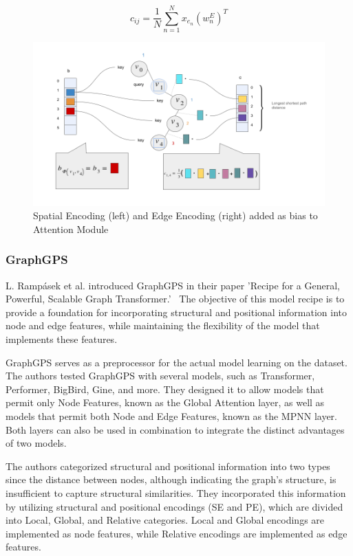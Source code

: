 \begin{equation}
    c_{ij} = \frac{1}{N} \sum_{n=1}^{N} x_{e_n}(w_n^E)^T
\end{equation}

\begin{figure}[ht!]
    \centering
    \includegraphics[scale=0.35]{tex/res/graphormer_attention.png}
    \caption{Spatial Encoding (left) and Edge Encoding (right) added as bias to Attention Module}
    \label{fig:graphormer_att}
\end{figure}

\subsubsection{GraphGPS}
L. Rampásek et al. introduced GraphGPS in their paper 'Recipe for a General, Powerful, Scalable Graph Transformer.'~\cite{2023graphgps} The objective of this model recipe is to provide a foundation for incorporating structural and positional information into node and edge features, while maintaining the flexibility of the model that implements these features.

GraphGPS serves as a preprocessor for the actual model learning on the dataset. The authors tested GraphGPS with several models, such as Transformer, Performer, BigBird, Gine, and more. They designed it to allow models that permit only Node Features, known as the Global Attention layer, as well as models that permit both Node and Edge Features, known as the MPNN layer. Both layers can also be used in combination to integrate the distinct advantages of two models.

The authors categorized structural and positional information into two types since the distance between nodes, although indicating the graph's structure, is insufficient to capture structural similarities. They incorporated this information by utilizing structural and positional encodings (SE and PE), which are divided into Local, Global, and Relative categories. Local and Global encodings are implemented as node features, while Relative encodings are implemented as edge features.

